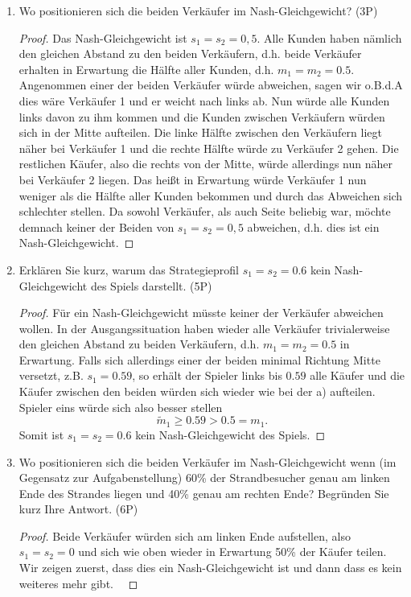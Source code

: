 \documentclass[12pt]{article}
\begin{document}
\begin{enumerate}[label=\alph*\upshape)]
	\item Wo positionieren sich die beiden Verkäufer im Nash-Gleichgewicht? (3P)
		\begin{proof}
			Das Nash-Gleichgewicht ist $s_1 = s_2 = 0,5$. Alle Kunden haben nämlich den gleichen Abstand zu den beiden Verkäufern, d.h. beide Verkäufer erhalten in Erwartung die Hälfte aller Kunden, d.h. $m_1 = m_2 = 0.5$. Angenommen einer der beiden Verkäufer würde abweichen, sagen wir o.B.d.A dies wäre Verkäufer 1 und er weicht nach links ab. Nun würde alle Kunden links davon zu ihm kommen und die Kunden zwischen Verkäufern würden sich in der Mitte aufteilen. Die linke Hälfte zwischen den Verkäufern liegt näher bei Verkäufer 1 und die rechte Hälfte würde zu Verkäufer 2 gehen. Die restlichen Käufer, also die rechts von der Mitte, würde allerdings nun näher bei Verkäufer 2 liegen. Das heißt in Erwartung würde Verkäufer 1 nun weniger als die Hälfte aller Kunden bekommen und durch das Abweichen sich schlechter stellen. Da sowohl Verkäufer, als auch Seite beliebig war, möchte demnach keiner der Beiden von $s_1 = s_2 = 0,5$ abweichen, d.h. dies ist ein Nash-Gleichgewicht.
		\end{proof}
	\item Erklären Sie kurz, warum das Strategieprofil $s_1 = s_2 = 0.6$ kein Nash-Gleichgewicht des Spiels darstellt. (5P)
		\begin{proof}
			Für ein Nash-Gleichgewicht müsste keiner der Verkäufer abweichen wollen. In der Ausgangssituation haben wieder alle Verkäufer trivialerweise den gleichen Abstand zu beiden Verkäufern, d.h. $m_1 = m_2 = 0.5$ in Erwartung. Falls sich allerdings einer der beiden minimal Richtung Mitte versetzt, z.B. $s_1 = 0.59$, so erhält der Spieler links bis $0.59$ alle Käufer und die Käufer zwischen den beiden würden sich wieder wie bei der a) aufteilen. Spieler eins würde sich also besser stellen 
			$$ \tilde{m}_1 \geq 0.59 > 0.5 = m_1. $$
			Somit ist $s_1 = s_2 = 0.6$ kein Nash-Gleichgewicht des Spiels.
		\end{proof}
	\item Wo positionieren sich die beiden Verkäufer im Nash-Gleichgewicht wenn (im Gegensatz zur Aufgabenstellung) 60\% der Strandbesucher genau am linken Ende des Strandes liegen und 40\% genau am rechten Ende? Begründen Sie kurz Ihre Antwort. (6P)
		\begin{proof}
			Beide Verkäufer würden sich am linken Ende aufstellen, also $s_1 = s_2 = 0$ und sich wie oben wieder in Erwartung 50\% der Käufer teilen. Wir zeigen zuerst, dass dies ein Nash-Gleichgewicht ist und dann dass es kein weiteres mehr gibt. ~\smallskip
			

\end{proof}
\end{enumerate}
\end{document}
